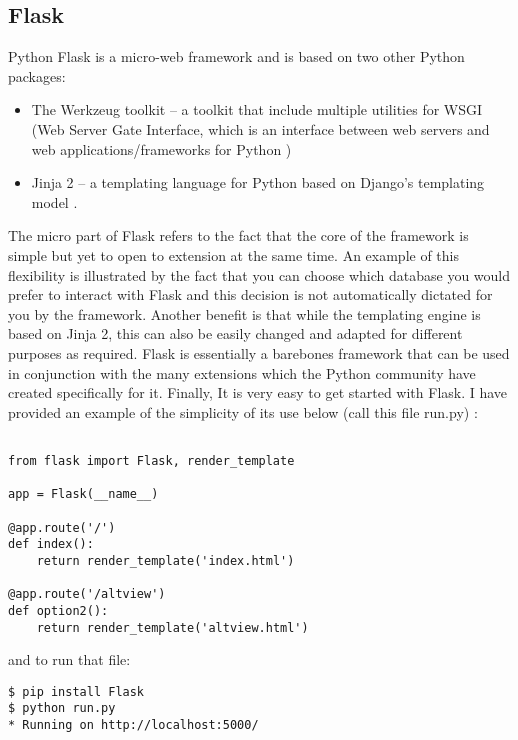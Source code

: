 \subsection{Flask}
Python Flask is a micro-web framework and is based on two other Python packages:
\begin{itemize}
	\item The Werkzeug toolkit – a toolkit that include multiple utilities for WSGI (Web Server Gate Interface, which is an interface between web servers and web applications/frameworks for Python \cite{werkzeug})
	\item Jinja 2 – a templating language for Python based on Django’s templating model \cite{jinja2}.
\end{itemize}
The micro part of Flask refers to the fact that the core of the framework is simple but yet to open to extension at the same time. An example of this flexibility is illustrated by the fact that you can choose which database you would prefer to interact with Flask and this decision is not automatically dictated for you by the framework. Another benefit is that while the templating engine is based on Jinja 2, this can also be easily changed and adapted for different purposes as required. Flask is essentially a barebones framework that can be used in conjunction with the many extensions which the Python community have created specifically for it. Finally, It is very easy to get started with Flask. I have provided an example of the simplicity of its use below (call this file run.py) \cite{flask}:
\begin{verbatim}

from flask import Flask, render_template

app = Flask(__name__)

@app.route('/')
def index():
	return render_template('index.html')

@app.route('/altview')
def option2():
	return render_template('altview.html')
\end{verbatim}
and to run that file:
\begin{verbatim}
$ pip install Flask
$ python run.py
* Running on http://localhost:5000/
\end{verbatim}

